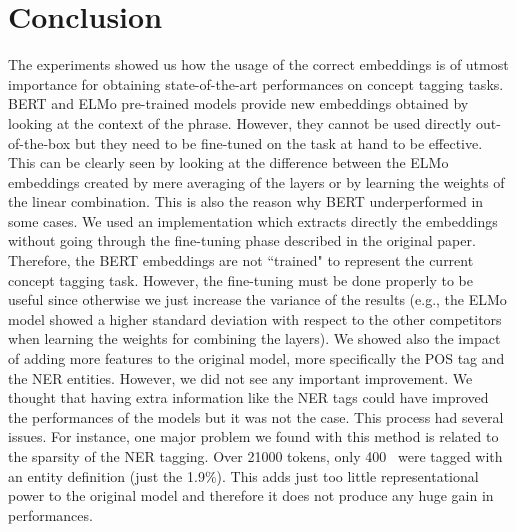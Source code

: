 \documentclass[11pt,a4paper]{article}
\begin{document}
\section{Conclusion}
The experiments showed us how the usage of the correct embeddings is of utmost importance for obtaining state-of-the-art performances on concept tagging tasks. BERT and ELMo pre-trained models provide new embeddings obtained by looking at the context of the phrase. However, they cannot be used directly out-of-the-box but they need to be fine-tuned on the task at hand to be effective. This can be clearly seen by looking at the difference between the ELMo embeddings created by mere averaging of the layers or by learning the weights of the linear combination. This is also the reason why BERT underperformed in some cases. We used an implementation which extracts directly the embeddings without going through the fine-tuning phase described in the original paper. Therefore, the BERT embeddings are not ``trained" to represent the current concept tagging task. However, the fine-tuning must be done properly to be useful since otherwise we just increase the variance of the results (e.g., the ELMo model showed a higher standard deviation with respect to the other competitors when learning the weights for combining the layers). 
We showed also the impact of adding more features to the original model, more specifically the POS tag and the NER entities. However, we did not see any important improvement. We thought that having extra information like the NER tags could have improved the performances of the models but it was not the case. This process had several issues. For instance, one major problem we found with this method is related to the sparsity of the NER tagging. Over 21000 tokens, only 400~ were tagged with an entity definition (just the 1.9\%). This adds just too little representational power to the original model and therefore it does not produce any huge gain in performances.



\end{document}
